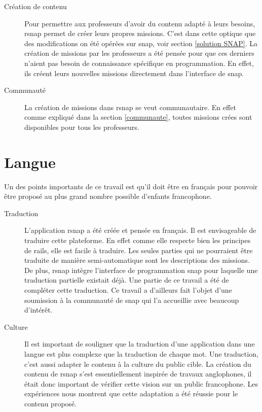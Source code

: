 \begin{description}
  \item[Création de contenu] Pour permettre aux professeurs d'avoir du contenu adapté à leurs besoins, \gls{rsnap} permet de créer leurs propres \glspl{mission}. C'est dans cette optique que des modifications on été opérées sur \gls{snap}, voir section \ref{solution SNAP}. La création de \glspl{mission} par les professeurs a été pensée pour que ces derniers n'aient pas besoin de connaissance spécifique en programmation. En effet, ils créent leurs nouvelles \glspl{mission} directement dans l'interface de \gls{snap}.

  \item[Communauté] La création de \glspl{mission} dans \gls{rsnap} se veut communautaire. En effet comme expliqué dans la section \ref{communaute}, toutes \glspl{mission} crées sont disponibles pour tous les professeurs.
\end{description}

\section{Langue}

Un des points importants de ce travail est qu'il doit être en français pour pouvoir être proposé au plus grand nombre possible d'enfants francophone.

\begin{description}
  \item[Traduction] L'application \gls{rsnap} a été créée et pensée en français. Il est envisageable de traduire cette plateforme. En effet comme elle respecte bien les principes de \gls{rails}, elle est facile à traduire. Les seules parties qui ne pourraient être traduite de manière semi-automatique sont les descriptions des \glspl{mission}. De plus, \gls{rsnap} intègre l'interface de programmation \gls{snap} pour laquelle une traduction partielle existait déjà. Une partie de ce travail a été de compléter cette traduction. Ce travail a d'ailleurs fait l'objet d'une soumission à la communauté de \gls{snap} qui l'a accueillie avec beaucoup d'intérêt.

  \item[Culture] Il est important de souligner que la traduction d'une application dans une langue est plus complexe que la traduction de chaque mot. Une traduction, c'est aussi adapter le contenu à la culture du public cible. La création du contenu de \gls{rsnap} s'est essentiellement inspirée de travaux anglophones, il était donc important de vérifier cette vision sur un public francophone. Les expériences nous montrent que cette adaptation a été réussie pour le contenu proposé.

\end{description}

